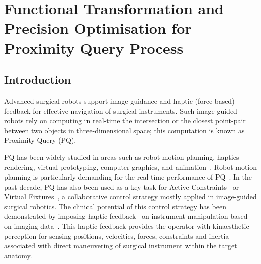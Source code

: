 
\chapter[Functional Transformation \& Precision Optimisation for PQ Process]{Functional Transformation and Precision Optimisation for Proximity Query Process}

\label{ch:precision}

\section{Introduction}
\label{sec:intro}

Advanced surgical robots support image guidance and haptic (force-based) feedback for effective navigation of surgical instruments. 
Such image-guided robots rely on computing in real-time the intersection or the closest point-pair
between two objects in three-dimensional space; 
this computation is known as Proximity Query (PQ).

PQ has been widely studied in areas such as robot motion planning, haptics rendering, virtual prototyping, computer graphics, and animation~\cite{gilbert90}.
Robot motion planning is particularly demanding for the real-time performance of PQ~\cite{chakraborty08}. 
In the past decade, PQ has also been used as a key task for Active Constraints~\cite{kwok10} or Virtual Fixtures~\cite{li07}, 
a collaborative control strategy mostly applied in image-guided surgical robotics. 
The clinical potential of this control strategy has been demonstrated by imposing haptic feedback~\cite{constantinescu05} on instrument manipulation based on imaging data~\cite{jakopec03}.
This haptic feedback provides the operator with kinaesthetic perception for sensing positions, velocities, forces, constraints and inertia associated with direct maneuvering of surgical
instrument within the target anatomy.

